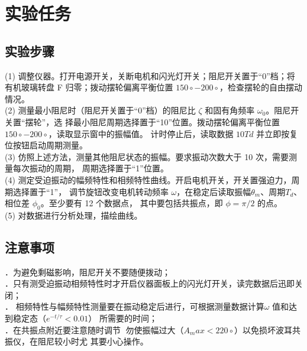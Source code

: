 \documentclass[UTF8]{ctexart}
\begin{document}
    \section{实验任务}
    \subsection{实验步骤} 

    \noindent  (1) 调整仪器。打开电源开关，关断电机和闪光灯开关；阻尼开关置于“0”档；将有机玻璃转盘 F
    归零；拨动摆轮偏离平衡位置 $150\circ − 200\circ$，检查摆轮的自由摆动情况。\\
    
    \noindent  (2) 测量最小阻尼时（阻尼开关置于“0”档）的阻尼比 $\zeta $ 和固有角频率 $\omega_0$。阻尼开关置“摆轮”，选
    择最小阻尼周期选择置于“10”位置。拨动摆轮偏离平衡位置$ 150\circ − 200\circ$，读取显示窗中的振幅值。
    计时停止后，读取数据 $10Td$ 并立即按复位按钮启动周期测量。\\
    
    \noindent  (3) 仿照上述方法，测量其他阻尼状态的振幅。要求振动次数大于 10 次，需要测量每次振动的周期，
    周期选择置于“1”位置。\\
    
    \noindent  (4) 测定受迫振动的幅频特性和相频特性曲线。开启电机开关，开关置强迫力，周期选择置于“1”，
    调节旋钮改变电机转动频率 $\omega$，在稳定后读取振幅$ \theta_m$、周期$ T_d$、相位差 $\phi_0$。至少要有 12 个数据点，
    其中要包括共振点，即 $\phi = \pi /2$ 的点。\\
    
    \noindent  (5) 对数据进行分析处理，描绘曲线。

    \subsection{注意事项}

    ．为避免剩磁影响，阻尼开关不要随便拨动；\\

    ．只有测受迫振动相频特性时才开启仪器面板上的闪光灯开关，读完数据后迅即关闭；\\

    ． 相频特性与幅频特性测量要在振动稳定后进行，可根据测量数据计算$ \omega$ 值和达到稳定态（$e^{-t/\tau}<0.01$）
    所需要的时间；\\

    ．在共振点附近要注意随时调节 勿使振幅过大（$A_max<220\circ$）以免损坏波耳共振仪，在阻尼较小时尤
    其要小心操作。\\
\end{document}
